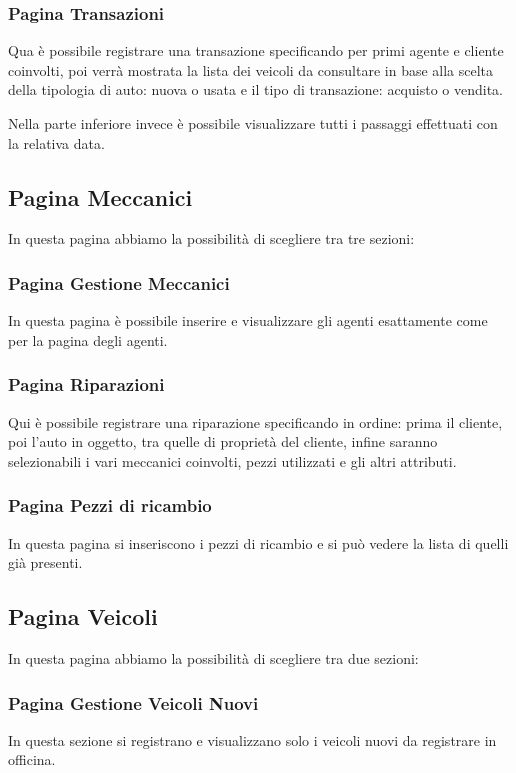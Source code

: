 \documentclass[a4paper,12pt]{report}
\begin{document}
\subsubsection*{Pagina Transazioni}
Qua è possibile registrare una transazione specificando per primi agente e cliente coinvolti, poi verrà mostrata la lista
%
dei veicoli da consultare in base alla scelta della tipologia di auto: nuova o usata e il tipo di transazione: acquisto o vendita.

Nella parte inferiore invece è possibile visualizzare tutti i passaggi effettuati con la relativa data.

\subsection*{Pagina Meccanici}
In questa pagina abbiamo la possibilità di scegliere tra tre sezioni:

\subsubsection*{Pagina Gestione Meccanici}
In questa pagina è possibile inserire e visualizzare gli agenti esattamente come per la pagina degli agenti.

\subsubsection*{Pagina Riparazioni}
Qui è possibile registrare una riparazione specificando in ordine: prima il cliente, poi l'auto in oggetto, tra quelle 
%
di proprietà del cliente, infine saranno selezionabili i vari meccanici coinvolti, pezzi utilizzati e gli altri attributi.

\subsubsection*{Pagina Pezzi di ricambio}
In questa pagina si inseriscono i pezzi di ricambio e si può vedere la lista di quelli già presenti.

\subsection*{Pagina Veicoli}
In questa pagina abbiamo la possibilità di scegliere tra due sezioni:

\subsubsection*{Pagina Gestione Veicoli Nuovi}
In questa sezione si registrano e visualizzano solo i veicoli nuovi da registrare in officina.
\end{document}
